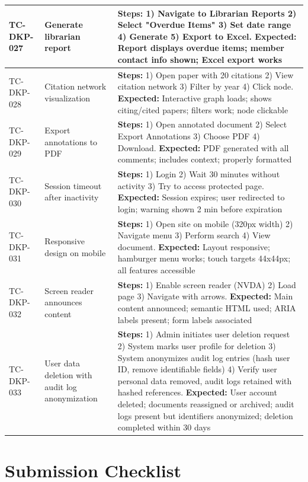 \documentclass[12pt,a4paper]{report}
\begin{document}
\begin{longtable}{|p{2cm}|p{3cm}|p{8.5cm}|}
TC-DKP-027 & Generate librarian report & \textbf{Steps:} 1) Navigate to Librarian Reports 2) Select "Overdue Items" 3) Set date range 4) Generate 5) Export to Excel. \textbf{Expected:} Report displays overdue items; member contact info shown; Excel export works \\ \hline
TC-DKP-028 & Citation network visualization & \textbf{Steps:} 1) Open paper with 20 citations 2) View citation network 3) Filter by year 4) Click node. \textbf{Expected:} Interactive graph loads; shows citing/cited papers; filters work; node clickable \\ \hline
TC-DKP-029 & Export annotations to PDF & \textbf{Steps:} 1) Open annotated document 2) Select Export Annotations 3) Choose PDF 4) Download. \textbf{Expected:} PDF generated with all comments; includes context; properly formatted \\ \hline
TC-DKP-030 & Session timeout after inactivity & \textbf{Steps:} 1) Login 2) Wait 30 minutes without activity 3) Try to access protected page. \textbf{Expected:} Session expires; user redirected to login; warning shown 2 min before expiration \\ \hline
TC-DKP-031 & Responsive design on mobile & \textbf{Steps:} 1) Open site on mobile (320px width) 2) Navigate menu 3) Perform search 4) View document. \textbf{Expected:} Layout responsive; hamburger menu works; touch targets 44x44px; all features accessible \\ \hline
TC-DKP-032 & Screen reader announces content & \textbf{Steps:} 1) Enable screen reader (NVDA) 2) Load page 3) Navigate with arrows. \textbf{Expected:} Main content announced; semantic HTML used; ARIA labels present; form labels associated \\ \hline
TC-DKP-033 & User data deletion with audit log anonymization & \textbf{Steps:} 1) Admin initiates user deletion request 2) System marks user profile for deletion 3) System anonymizes audit log entries (hash user ID, remove identifiable fields) 4) Verify user personal data removed, audit logs retained with hashed references. \textbf{Expected:} User account deleted; documents reassigned or archived; audit logs present but identifiers anonymized; deletion completed within 30 days \\ \hline
\end{longtable}

\chapter{Submission Checklist}
\end{document}
